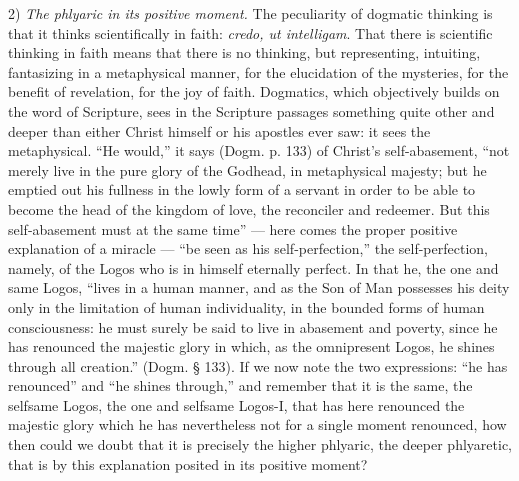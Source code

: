 \documentclass[12pt]{book}
\newcommand{\opage}[1]{\marginnote{\footnotesize\textit{[#1]}}}
\begin{document}
2) \emph{The phlyaric in its positive moment.} The peculiarity of dogmatic thinking is that it thinks scientifically in faith: \textit{credo, ut intelligam}. That there is scientific thinking in faith means that there is no thinking, but representing, intuiting, fantasizing in a metaphysical manner, for the elucidation of the mysteries, for the benefit of revelation, for the joy of faith. Dogmatics, which objectively builds on the word of Scripture, sees in the Scripture passages something quite other and deeper than either Christ himself or his apostles ever saw: it sees the metaphysical. ``He would,'' it says (Dogm. p. 133) of Christ's self-abasement, ``not merely
\opage{93}\setcounter{footnote}{0}%
live in the pure glory of the Godhead, in metaphysical majesty; but he emptied out his fullness in the lowly form of a servant in order to be able to become the head of the kingdom of love, the reconciler and redeemer. But this self-abasement must at the same time'' --- here comes the proper positive explanation of a miracle --- ``be seen as his self-perfection,'' the self-perfection, namely, of the Logos who is in himself eternally perfect. In that he, the one and same Logos, ``lives in a human manner, and as the Son of Man possesses his deity only in the limitation of human individuality, in the bounded forms of human consciousness: he must surely be said to live in abasement and poverty, since he has renounced the majestic glory in which, as the omnipresent Logos, he shines through all creation.'' (Dogm. § 133). If we now note the two expressions: ``he has renounced'' and ``he shines through,'' and remember that it is the same, the selfsame Logos, the one and selfsame Logos-I, that has here renounced the majestic glory which he has nevertheless not for a single moment renounced, how then could we doubt that it is precisely the higher phlyaric, the deeper phlyaretic, that is by this explanation posited in its positive moment?
\end{document}
